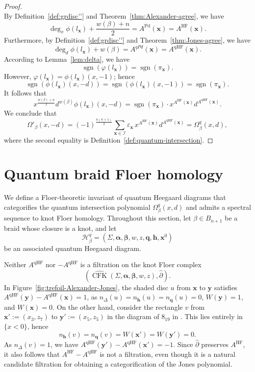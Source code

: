 \documentclass[11pt]{amsart}
\numberwithin{equation}{section}
\numberwithin{figure}{section}
\theoremstyle{definition}
\newcommand{\cH}{\mathcal{H}}
\newcommand{\cI}{\mathcal{I}}
\newcommand{\ph}{\widehat{\partial}}
\DeclareMathOperator{\qHF}{qHF}
\DeclareMathOperator{\CFK}{CFK}
\newcommand{\CFKh}{\widehat{\CFK}}
\DeclareMathOperator{\HF}{HF}
\DeclareMathOperator{\sgn}{\text{sgn}}
\DeclareMathOperator{\Pd}{Pd}
\newcommand{\as}{\boldsymbol{\alpha}}
\newcommand{\bs}{\boldsymbol{\beta}}
\newcommand{\hs}{\boldsymbol{h}}
\newcommand{\qs}{\boldsymbol{q}}
\newcommand{\xs}{\boldsymbol{x}}
\newcommand{\ys}{\boldsymbol{y}}
\begin{document}
\begin{proof}
\[\]
By Definition~\ref{def:grdisc''} and Theorem~\ref{thm:Alexander-agree}, we have
\begin{equation}
\deg_x \phi(l_{\xs}) + \frac{w(\beta)+n}{2} = A^{\Pd}(\xs) = A^{\HF}(\xs).
\end{equation}
Furthermore, by Definition~\ref{def:grdisc''} and Theorem~\ref{thm:Jones-agree}, we have
\begin{equation}
\deg_d \phi(l_{\xs}) + w(\beta) = A^{qPd}(\xs) = A^{\qHF}(\xs).
\end{equation}
According to Lemma~\ref{lem:delta}, we have
\[
\sgn(\varphi(l_{\xs})) = \sgn(\pi_{\xs}).
\]
However, $\varphi(l_{\xs}) = \phi(l_{\xs})(x,-1)$; hence
\[
\sgn(\phi(l_{\xs})(x,-d)) = \sgn(\phi(l_{\xs})(x,-1)) = \sgn(\pi_{\xs}).
\]
It follows that
\[
x^{\frac{w(\beta)+n}{2}} d^{w(\beta)} \phi(l_{\xs})(x,-d) = \sgn(\pi_{\xs}) \cdot x^{A^{\HF}(\xs)} d^{A^{\qHF}(\xs)}.
\]
We conclude that
\[
\Omega'_\beta(x,-d) = (-1)^{\frac{n(n+1)}{2}}\sum_{\xs \in \cI} \varepsilon_{\xs} \, x^{A^{\HF}(\xs)} d^{A^{\qHF}(\xs)} = \Omega^q_\beta(x,d),
\]
where the second equality is Definition~\ref{def:quantum-intersection}.
\end{proof}


\section{Quantum braid Floer homology}

We define a Floer-theoretic invariant of quantum Heegaard diagrams that categorifies the quantum intersection polynomial $\Omega^q_\beta(x,d)$ and admits a spectral sequence to knot Floer homology. Throughout this section, let $\beta \in B_{n+1}$ be a braid whose closure is a knot, and let
\[
\cH^q_\beta = (\Sigma,\as,\bs, w, z, \qs, \hs, \xs^0)
\]
be an associated quantum Heegaard diagram.

\begin{rmk}
    Neither $A^{\qHF}$ nor $-A^{\qHF}$ is a filtration on the knot Floer complex 
    \[
    \left(\CFKh(\Sigma,\as,\bs,w,z), \ph\right).
    \]
    In Figure~\ref{fig:trefoil-Alexander-Jones}, the shaded disc $u$ from $\xs$ to $\ys$ satisfies $A^{\qHF}(\ys) - A^{\qHF}(\xs) = 1$, as $n_\Delta(u) = n_{\hs}(u) = n_{\qs}(u) = 0$, $W(\ys) = 1$, and $W(\xs) = 0$. On the other hand, consider the rectangle $v$ from $\xs' := (x_3,z_7)$ to $\ys' := (x_5,z_5)$ in the diagram of $8_{19}$ in \cite[Figure~7.2]{Anghel2023TAMS}. This lies entirely in $\{x<0\}$, hence 
    \[
    n_{\hs}(v) = n_{\qs}(v) = W(\xs') = W(\ys') = 0. 
    \]
    As $n_\Delta(v) = 1$, we have $A^{\qHF}(\ys') - A^{\qHF}(\xs') = -1$. Since $\ph$ preserves $A^{\HF}$, it also follows that $A^{\HF} - A^{\qHF}$ is not a filtration, even though it is a natural candidate filtration for obtaining a categorification of the Jones polynomial.
\end{rmk}
\end{document}
